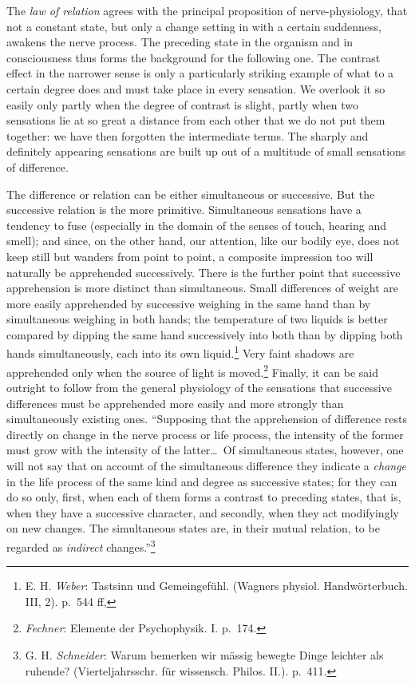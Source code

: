 \documentclass[12pt,a4paper]{book}
\newcommand{\opage}[1]{\marginnote{\footnotesize\textit{[#1]}}}
\begin{document}
The \emph{law of relation} agrees with the principal proposition of
nerve-physiology, that not a constant state, but only a change setting
in with a certain suddenness, awakens the nerve process. The preceding
state in the organism and in consciousness thus forms the background for
the following one. The contrast effect in the narrower sense is only a
particularly striking example of what to a certain degree does and must
take place in every sensation. We overlook it so easily only partly when
the degree of contrast is slight, partly when two sensations lie at so
great a distance from each other that we do not put them together: we
have then forgotten the intermediate terms. The sharply and definitely
appearing sensations are built up out of a multitude of small sensations
of difference.

The difference or relation can be either simultaneous or successive.
But the successive relation is the more primitive. Simultaneous
sensations have a tendency to fuse (especially in the domain of the
senses of touch, hearing and smell); and since, on the other hand, our
attention, like our bodily eye, does not keep still but wanders from
point to point, a composite impression too will naturally be apprehended
successively. There is the further point that successive apprehension is
more distinct than simultaneous. Small differences of weight are more
easily apprehended by successive weighing in the same hand than by
simultaneous weighing in both hands; the temperature of two liquids is
better compared by dipping the same hand successively into both than by
dipping both hands simultaneously, each into its own
liquid.\footnote{E. H. \emph{Weber}: Tastsinn und Gemeingefühl.
(Wagners physiol. Handwörterbuch. III, 2). p.~544 ff,} Very faint
shadows are apprehended only
when the source of light is moved.\footnote{\emph{Fechner}: Elemente der
Psychophysik. I. p.~174.} Finally, it can be said outright to follow
from the general physiology of the sensations that successive
differences must be apprehended more easily and more strongly than
simultaneously existing ones. ``Supposing that the apprehension of
difference rests directly on change in the nerve process or life
process, the intensity of the former must grow with the intensity of the
latter\ldots\ Of
\opage{142}simultaneous states, however, one will not say that on account
of the simultaneous difference they indicate a \emph{change} in the life
process of the same kind and degree as successive states; for they can
do so only, first, when each of them forms a contrast to preceding
states, that is, when they have a successive character, and secondly,
when they act modifyingly on new changes. The simultaneous states are,
in their mutual relation, to be regarded as \emph{indirect}
changes.''\footnote{G. H. \emph{Schneider}: Warum bemerken wir mässig
bewegte Dinge leichter als ruhende? (Vierteljahrsschr. für wissensch.
Philos. II.). p.~411.}
\end{document}
